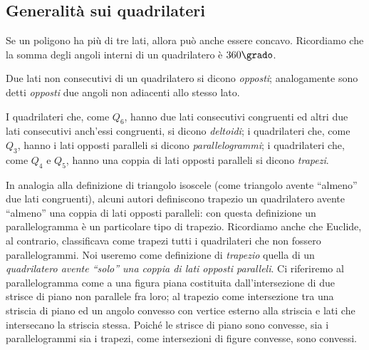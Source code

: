 \subsection{Generalità sui quadrilateri}

Se un poligono ha più di tre lati, allora può anche essere concavo. 
Ricordiamo che la somma degli angoli interni di un quadrilatero è 
\(360\grado\).

\begin{definizione}
Due lati non consecutivi di un quadrilatero si dicono \emph{opposti}; 
analogamente sono detti \emph{opposti} due angoli non adiacenti allo 
stesso lato.
\end{definizione}


I quadrilateri che, come \(Q_6\), hanno due lati consecutivi congruenti 
ed altri due lati consecutivi anch'essi congruenti, si dicono 
\emph{deltoidi}; i quadrilateri che, come \(Q_3\), hanno i lati opposti 
paralleli si dicono \emph{parallelogrammi}; i quadrilateri che, come 
\(Q_4\) e \(Q_5\), hanno una coppia di lati opposti paralleli si dicono 
\emph{trapezi}.

\osservazione In analogia alla definizione di triangolo isoscele 
(come triangolo avente ``almeno'' due lati congruenti), alcuni autori 
definiscono trapezio un quadrilatero avente ``almeno'' una coppia di 
lati opposti paralleli: con questa definizione un parallelogramma è 
un particolare tipo di trapezio. Ricordiamo anche che Euclide, al 
contrario, classificava come trapezi tutti i quadrilateri che non 
fossero parallelogrammi. Noi useremo come definizione di 
\emph{trapezio} quella di un \emph{quadrilatero avente ``solo'' una 
  coppia di lati opposti paralleli}. Ci riferiremo al parallelogramma 
come a una figura piana costituita dall'intersezione di due strisce 
di piano non parallele fra loro; al trapezio come intersezione tra 
una striscia di piano ed un angolo convesso con vertice esterno alla 
striscia e lati che intersecano la striscia stessa. Poiché le strisce 
di piano sono convesse, sia i parallelogrammi sia i trapezi, come 
intersezioni di figure convesse, sono convessi.

